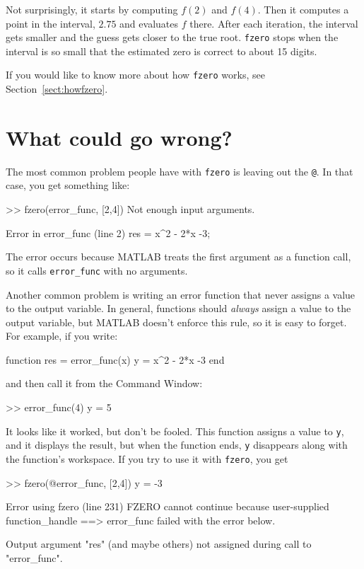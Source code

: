 \documentclass[
]{book}
\numberwithin{Answer}{chapter}
\numberwithin{Exercise}{chapter}
\begin{document}
Not surprisingly, it starts by computing $f(2)$ and $f(4)$.  Then it computes a point in the interval, $2.75$ and evaluates $f$ there.  After each iteration, the interval gets smaller and the guess gets closer to the true root.
{\tt fzero} stops when the interval is so small that the estimated
zero is correct to about 15 digits.
 
If you would like to know more about how {\tt fzero} works, see Section~\ref{sect:howfzero}.


\section{What could go wrong?}

The most common problem people have with {\tt fzero} is leaving
out the {\tt @}.  In that case, you get something like:

\begin{code}
>> fzero(error_func, [2,4])
Not enough input arguments.

Error in error_func (line 2)
    res = x^2 - 2*x -3;
\end{code}

The error occurs because MATLAB treats the first argument as a function call, so it calls {\tt error\_func} with no arguments.


Another common problem is writing an error function that never
assigns a value to the output variable.  In general, functions should
{\em always} assign a value to the output variable, but MATLAB doesn't
enforce this rule, so it is easy to forget.  For example, if you
write:

\begin{code}
function res = error_func(x)
    y = x^2 - 2*x -3
end
\end{code}

and then call it from the {\sf Command Window}:

\begin{code}
>> error_func(4)
y = 5
\end{code}

It looks like it worked, but don't be fooled.  This function assigns
a value to {\tt y}, and it displays the result, but when the function
ends, {\tt y} disappears along with the function's workspace.
If you try to use it with {\tt fzero}, you get

\begin{code}
>> fzero(@error_func, [2,4])
y = -3

Error using fzero (line 231)
FZERO cannot continue because user-supplied function_handle ==>
error_func failed with the error below.

Output argument "res" (and maybe others) not assigned during call
to "error_func".
\end{code}
\end{document}
